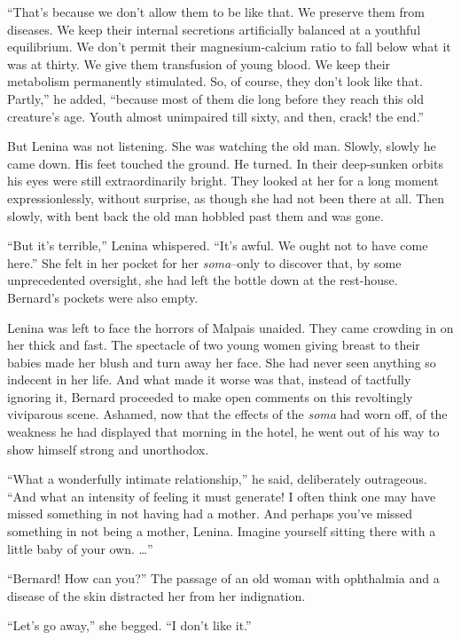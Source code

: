 \documentclass[12pt]{report}
\begin{document}
``That's because we don't allow them to be like that. We preserve them
from diseases. We keep their internal secretions artificially balanced
at a youthful equilibrium. We don't permit their magnesium-calcium ratio
to fall below what it was at thirty. We give them transfusion of young
blood. We keep their metabolism permanently stimulated. So, of course,
they don't look like that. Partly,'' he added, ``because most of them
die long before they reach this old creature's age. Youth almost
unimpaired till sixty, and then, crack! the end.''

But Lenina was not listening. She was watching the old man. Slowly,
slowly he came down. His feet touched the ground. He turned. In their
deep-sunken orbits his eyes were still extraordinarily bright. They
looked at her for a long moment expressionlessly, without surprise, as
though she had not been there at all. Then slowly, with bent back the
old man hobbled past them and was gone.

``But it's terrible,'' Lenina whispered. ``It's awful. We ought not to
have come here.'' She felt in her pocket for her \emph{soma}--only to
discover that, by some unprecedented oversight, she had left the bottle
down at the rest-house. Bernard's pockets were also empty.

Lenina was left to face the horrors of Malpais unaided. They came
crowding in on her thick and fast. The spectacle of two young women
giving breast to their babies made her blush and turn away her face. She
had never seen anything so indecent in her life. And what made it worse
was that, instead of tactfully ignoring it, Bernard proceeded to make
open comments on this revoltingly viviparous scene. Ashamed, now that
the effects of the \emph{soma} had worn off, of the weakness he had
displayed that morning in the hotel, he went out of his way to show
himself strong and unorthodox.

``What a wonderfully intimate relationship,'' he said, deliberately
outrageous. ``And what an intensity of feeling it must generate! I often
think one may have missed something in not having had a mother. And
perhaps you've missed something in not being a mother, Lenina. Imagine
yourself sitting there with a little baby of your own. \ldots{}''

``Bernard! How can you?'' The passage of an old woman with ophthalmia
and a disease of the skin distracted her from her indignation.

``Let's go away,'' she begged. ``I don't like it.''
\end{document}
